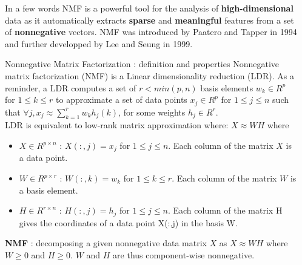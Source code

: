 \documentclass[final]{beamer}
\newlength{\sepwid}
\newlength{\onecolwid}
\newlength{\threecolwid}
\begin{document}
\begin{frame}
\begin{columns}[t]
\begin{column}{\threecolwid}
\begin{columns}[t]
\begin{column}{\onecolwid}
\begin{exampleblock}{In a few words}
NMF is a powerful tool for the analysis of \textbf{high-dimensional} data as it automatically extracts \textbf{sparse} and \textbf{meaningful} features from a set of \textbf{nonnegative} vectors.
NMF was introduced by Paatero and Tapper %
in 1994 and further developped by Lee and Seung %
in 1999.
\end{exampleblock}


\begin{exampleblock}{Nonnegative Matrix Factorization : definition and properties}
Nonnegative matrix factorization (NMF) is a Linear dimensionality reduction (LDR). As a reminder, a LDR computes a set of $r < min(p,n)$ basis elements $w_k \in R^p$ for $1 \leq k \leq r$ to approximate a set of data points $x_j \in R^{p}$ for $1 \leq j \leq n$ such that $\forall j, x_j \approx \sum_{k = 1}^{r} w_{k} h_{j}(k)$, for some weights $h_j\in R^r$. \\
LDR is equivalent to low-rank matrix approximation where: $X \approx W H$ where \\
     \begin{itemize}
     \item $X \in R^{p \times n}$ : $X(:,j) = x_j$ for $1 \leq j \leq n$. Each column of the matrix $X$ is a data point.
     \item $W \in R^{p \times r}$ : $W(:,k) = w_k$ for $1 \leq k \leq r$. Each column of the matrix $W$ is a basis element.
     \item $H \in R^{r \times n}$ : $H(:,j) = h_j$ for $1 \leq j \leq n$. Each column of the matrix H gives the coordinates of a data point X(:,j) in the basis W.
     \end{itemize}

     \textbf{NMF} : decomposing a given nonnegative data matrix $X$ as $X \approx W H$ where $W \geq 0$ and $H \geq 0$. $W$ and $H$ are thus component-wise nonnegative.
     
\end{exampleblock}

\end{column} %

\begin{column}{\sepwid}
\end{column} %


\end{columns}
\end{column}
\end{columns}
\end{frame}
\end{document}
